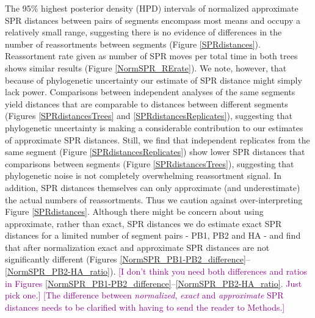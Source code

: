 \documentclass[11pt,oneside,letterpaper]{article}
\def\tbc#1{\textcolor{purple}{[#1]}}
\begin{document}
The 95\% highest posterior density (HPD) intervals of normalized approximate SPR distances between pairs of segments encompass most means and occupy a relatively small range, suggesting there is no evidence of differences in the number of reassortments between segments (Figure \ref{SPRdistances}).
Reassortment rate given as number of SPR moves per total time in both trees shows similar results (Figure \ref{NormSPR_RErate}).
We note, however, that because of phylogenetic uncertainty our estimate of SPR distance might simply lack power.
Comparisons between independent analyses of the same segments yield distances that are comparable to distances between different segments (Figures \ref{SPRdistancesTrees} and \ref{SPRdistancesReplicates}), suggesting that phylogenetic uncertainty is making a considerable contribution to our estimates of approximate SPR distances.
Still, we find that independent replicates from the same segment (Figure \ref{SPRdistancesReplicates}) show lower SPR distances that comparisons between segments (Figure \ref{SPRdistancesTrees}), suggesting that phylogenetic noise is not completely overwhelming reassortment signal.
In addition, SPR distances themselves can only approximate (and underestimate) the actual numbers of reassortments.
Thus we caution against over-interpreting Figure \ref{SPRdistances}.
Although there might be concern about using approximate, rather than exact, SPR distances we do estimate exact SPR distances for a limited number of segment pairs - PB1, PB2 and HA - and find that after normalization exact and approximate SPR distances are not significantly different (Figures \ref{NormSPR_PB1-PB2_difference}--\ref{NormSPR_PB2-HA_ratio}).
\tbc{I don't think you need both differences and ratios in Figures \ref{NormSPR_PB1-PB2_difference}--\ref{NormSPR_PB2-HA_ratio}.  Just pick one.}
\tbc{The difference between \textit{normalized}, \textit{exact} and \textit{approximate} SPR distances needs to be clarified with having to send the reader to Methods.}
\end{document}
